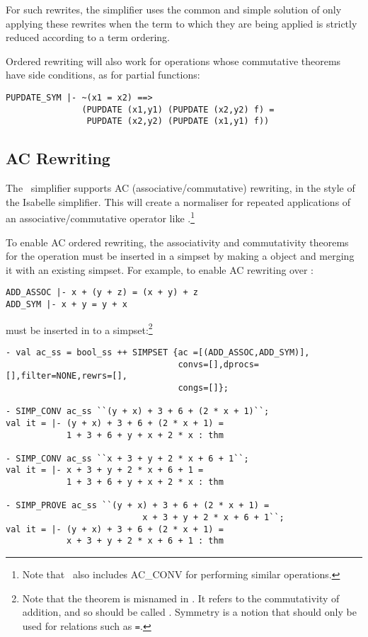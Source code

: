 \documentclass[a4]{article}
\begin{document}
For such rewrites, the simplifier uses the common and
simple solution of only applying these rewrites when the term
to which they are being applied is strictly reduced according to a term
ordering.

Ordered rewriting will also work for operations whose
commutative theorems have side conditions, as for partial functions:
\begin{hol} \begin{verbatim}
PUPDATE_SYM |- ~(x1 = x2) ==>
               (PUPDATE (x1,y1) (PUPDATE (x2,y2) f) =
                PUPDATE (x2,y2) (PUPDATE (x1,y1) f))
\end{verbatim} \end{hol}

\subsection{AC Rewriting}

The \HOL\ simplifier supports AC (associative/commutative) rewriting,
in the style of the Isabelle simplifier.  This will create a
normaliser for repeated applications of an associative/commutative
operator like \ml{+}.\footnote{Note that \HOL\ also includes AC\_CONV
for performing similar operations.}

To enable AC ordered rewriting, the associativity and commutativity theorems
for the operation must be inserted in a simpset by making a 
object and merging it with an existing simpset. For example, to enable
AC rewriting over \ml{+}:
\begin{hol} \begin{verbatim}
ADD_ASSOC |- x + (y + z) = (x + y) + z
ADD_SYM |- x + y = y + x
\end{verbatim} \end{hol}
must be inserted in to a simpset:\footnote{Note that
the theorem  is misnamed in \HOL.  It refers
to the commutativity of addition, and so should be called
.
Symmetry is a notion that should only be used for relations such as
{\tt =}.}
\begin{boxed} \begin{verbatim}
- val ac_ss = bool_ss ++ SIMPSET {ac =[(ADD_ASSOC,ADD_SYM)],
                                  convs=[],dprocs=[],filter=NONE,rewrs=[],
                                  congs=[]};

- SIMP_CONV ac_ss ``(y + x) + 3 + 6 + (2 * x + 1)``;
val it = |- (y + x) + 3 + 6 + (2 * x + 1) =
            1 + 3 + 6 + y + x + 2 * x : thm

- SIMP_CONV ac_ss ``x + 3 + y + 2 * x + 6 + 1``;
val it = |- x + 3 + y + 2 * x + 6 + 1 =
            1 + 3 + 6 + y + x + 2 * x : thm

- SIMP_PROVE ac_ss ``(y + x) + 3 + 6 + (2 * x + 1) =
                           x + 3 + y + 2 * x + 6 + 1``;
val it = |- (y + x) + 3 + 6 + (2 * x + 1) =
            x + 3 + y + 2 * x + 6 + 1 : thm
\end{verbatim} \end{boxed}
\end{document}
